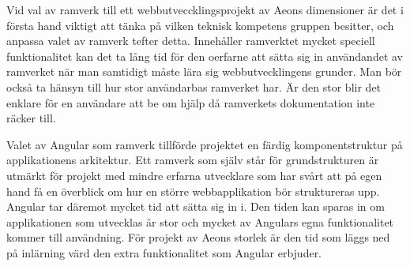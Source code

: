 Vid val av ramverk till ett webbutveccklingsprojekt av Aeons dimensioner är det i första hand viktigt att tänka på vilken teknisk kompetens gruppen besitter, och anpassa valet av ramverk tefter detta. Innehåller ramverktet mycket speciell funktionalitet kan det ta lång tid för den oerfarne att sätta sig in användandet av ramverket när man samtidigt måste lära sig webbutvecklingens grunder. Man bör också ta hänsyn till hur stor användarbas ramverket har. Är den stor blir det enklare för en användare att be om hjälp då ramverkets dokumentation inte räcker till.

Valet av Angular som ramverk tillförde projektet en färdig komponentstruktur på applikationens arkitektur. Ett ramverk som själv står för grundstrukturen är utmärkt för projekt med mindre erfarna utvecklare som har svårt att på egen hand få en överblick om hur en större webbapplikation bör struktureras upp. Angular tar däremot mycket tid att sätta sig in i. Den tiden kan sparas in om applikationen som utvecklas är stor och mycket av Angulars egna funktionalitet kommer till användning. För projekt av Aeons storlek är den tid som läggs ned på inlärning värd den extra funktionalitet som Angular erbjuder.

